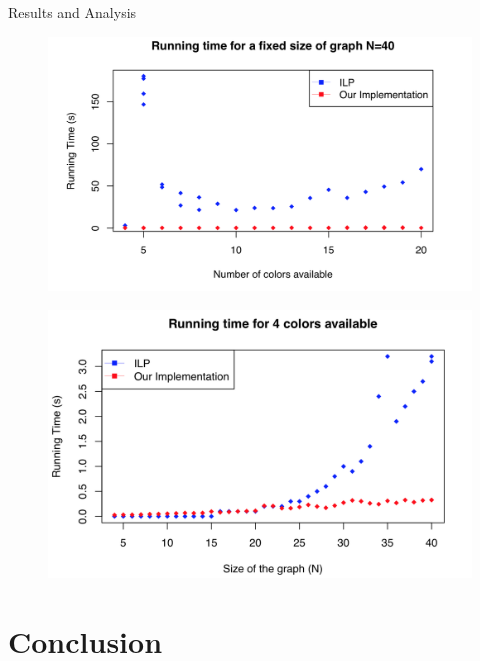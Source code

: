 \documentclass{beamer}
\begin{document}
\begin{frame}{Results and Analysis}
\begin{figure}
\centering
\begin{minipage}{.5\textwidth}
  \centering
  \includegraphics[width=1\linewidth]{40SizeRunTime.png}
  \label{fig:test1}
\end{minipage}%
\begin{minipage}{.5\textwidth}
  \centering
  \includegraphics[width=1\linewidth]{4colorsRunTime.png}
  \label{fig:test2}
\end{minipage}
\end{figure}

\vskip 1cm

\end{frame}

\section{Conclusion}
\end{document}
